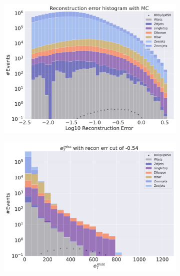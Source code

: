\begin{figure}[H]
    \centering
    \begin{subfigure}{.40\textwidth}
        \includegraphics[width=\textwidth]{Figures/VAE_testing/big/2lep/b_data_recon_big_rm3_feats_sig_800p0p050_.pdf}
        \caption{ }
        \label{fig:VAE_2lep_big_800_2}
    \end{subfigure}
    \hfill
    \begin{subfigure}{.40\textwidth}
        \includegraphics[width=\textwidth]{Figures/VAE_testing/big/2lep/b_data_recon_big_rm3_feats_sig_800p0p050_recon_errcut_-0.54.pdf}
        \caption{}
        \label{fig:VAE_2lep_big_etmiss_800_2}
    \end{subfigure}
    \hfill
      

\end{figure}
